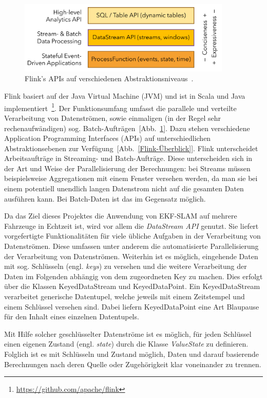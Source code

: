 \documentclass[11pt]{article}
\begin{document}
\begin{figure}[!t]
	\centering
	\includegraphics[width=4in]{Flink-api-stack.png}
	\caption{Flink's APIs auf verschiedenen Abstraktionsniveaus~\cite{Flink-APIs-Link}.}
	\label{Flink-APIs}
\end{figure}

Flink basiert auf der Java Virtual Machine (JVM) und ist in Scala und Java implementiert~\footnote{\url{https://github.com/apache/flink}}. Der Funktionsumfang umfasst die parallele und verteilte Verarbeitung von Datenströmen, sowie einmaligen (in der Regel sehr rechenaufwändigen) sog. Batch-Aufträgen~[Abb.~\ref{Flink-APIs}]. Dazu stehen verschiedene Application Programming Interfaces (APIs) auf unterschiedlichen Abstraktionsebenen zur Verfügung~[Abb.~\ref{Flink-Überblick}]. Flink unterscheidet Arbeitsaufträge in Streaming- und Batch-Auf\-trä\-ge. Diese unterscheiden sich in der Art und Weise der Parallelisierung der Berechnungen: bei Streams müssen beispielsweise Aggregationen mit einem Fenster versehen werden, da man sie bei einem potentiell unendlich langen Datenstrom nicht auf die gesamten Daten ausführen kann. Bei Batch-Daten ist das im Gegensatz möglich.

Da das Ziel dieses Projektes die Anwendung von EKF-SLAM auf mehrere Fahrzeuge in Echtzeit ist, wird vor allem die \textit{DataStream API} genutzt. Sie liefert vorgefertigte Funktionalitäten für viele übliche Aufgaben in der Verarbeitung von Datenströmen. Diese umfassen unter anderem die automatisierte Parallelisierung der Verarbeitung von Datenströmen. Weiterhin ist es möglich, eingehende Daten mit sog. Schlüsseln (engl. \textit{keys}) zu versehen und die weitere Verarbeitung der Daten im Folgenden abhängig von dem zugeordneten Key zu machen. Dies erfolgt über die Klassen KeyedDataStream und KeyedDataPoint. Ein KeyedDataStream verarbeitet generische Datentupel, welche jeweils mit einem Zeitstempel und einem Schlüssel versehen sind. Dabei liefern KeyedDataPoint eine Art Blaupause für den Inhalt eines einzelnen Datentupels.

Mit Hilfe solcher geschlüsselter Datenströme ist es möglich, für jeden Schlüssel einen eigenen Zustand (engl. \textit{state}) durch die Klasse \textit{ValueState} zu definieren. Folglich ist es mit Schlüsseln und Zustand möglich, Daten und darauf basierende Berechnungen nach deren Quelle oder Zugehörigkeit klar voneinander zu trennen.
\end{document}
